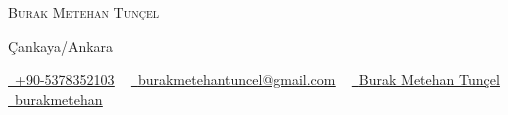 \begin{center}
  {
    \Huge \scshape Burak Metehan Tunçel
  }

  Çankaya/Ankara

  \small{
    \href{tel:+905378352103}{\raisebox{-0.1\height}\faPhone\ \underline{+90-5378352103}} ~ 
    \href{mailto:burakmetehantuncel@gmail.com}{\raisebox{-0.2\height}\faEnvelope\  \underline{burakmetehantuncel@gmail.com}} ~
    \href{https://www.linkedin.com/in/burak-metehan-tuncel/}{\raisebox{-0.2\height}\faLinkedinSquare\ \underline{Burak Metehan Tunçel}} ~
    \href{https://github.com/burakmetehan}{\raisebox{-0.2\height}\faGithub\ \underline{burakmetehan}}
  } 
\end{center}
